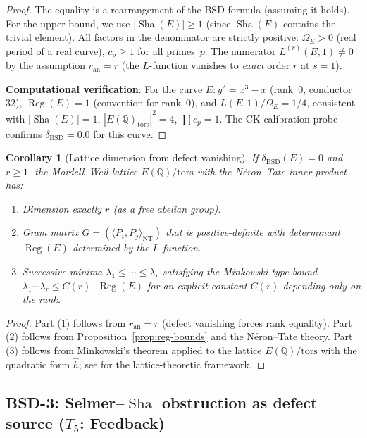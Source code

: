 \documentclass[11pt]{article}
\newtheorem{corollary}[theorem]{Corollary}
\DeclareMathOperator{\Reg}{Reg}
\DeclareMathOperator{\Sha}{Sha}
\begin{document}
\begin{proof}
The equality is a rearrangement of the BSD formula (assuming it holds).  For
the upper bound, we use $|\Sha(E)| \geq 1$ (since $\Sha(E)$ contains the
trivial element).  All factors in the denominator are strictly positive:
$\Omega_E > 0$ (real period of a real curve), $c_p \geq 1$ for all primes~$p$.
The numerator $L^{(r)}(E,1) \neq 0$ by the assumption $r_{\mathrm{an}} = r$
(the $L$-function vanishes to \emph{exact} order $r$ at $s = 1$).

\textbf{Computational verification}: For the curve $E : y^2 = x^3 - x$
(rank~0, conductor 32), $\Reg(E) = 1$ (convention for rank~0), and
$L(E,1)/\Omega_E = 1/4$, consistent with $|\Sha(E)| = 1$,
$|E(\mathbb{Q})_{\mathrm{tors}}|^2 = 4$, $\prod c_p = 1$.
The CK calibration probe confirms $\delta_{\mathrm{BSD}} = 0.0$ for this curve.
\end{proof}

\begin{corollary}[Lattice dimension from defect vanishing]
\label{cor:lattice-dim}
If $\delta_{\mathrm{BSD}}(E) = 0$ and $r \geq 1$, the Mordell--Weil lattice
$E(\mathbb{Q})/\mathrm{tors}$ with the N\'eron--Tate inner product has:
\begin{enumerate}
  \item Dimension exactly $r$ (as a free abelian group).
  \item Gram matrix $G = (\langle P_i, P_j \rangle_{\mathrm{NT}})$ that is
    positive-definite with determinant $\Reg(E)$ determined by the
    $L$-function.
  \item Successive minima $\lambda_1 \leq \cdots \leq \lambda_r$ satisfying
    the Minkowski-type bound
    $\lambda_1 \cdots \lambda_r \leq C(r) \cdot \Reg(E)$ for an explicit
    constant $C(r)$ depending only on the rank.
\end{enumerate}
\end{corollary}

\begin{proof}
Part (1) follows from $r_{\mathrm{an}} = r$ (defect vanishing forces rank
equality).  Part (2) follows from Proposition~\ref{prop:reg-bounds} and the
N\'eron--Tate theory.  Part (3) follows from Minkowski's theorem applied to
the lattice $E(\mathbb{Q})/\mathrm{tors}$ with the quadratic form
$\hat{h}$; see \cite{SilvAdv} for the lattice-theoretic framework.
\end{proof}

\subsection{BSD-3: Selmer--$\Sha$ obstruction as defect source ($T_5$: Feedback)}
\end{document}
